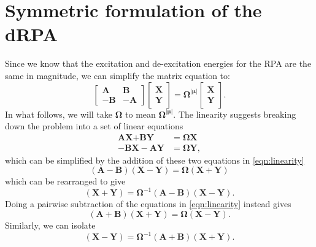 \documentclass[12pt]{caltech_thesis}
\begin{document}
\chapter{Symmetric formulation of the dRPA}
\label{app:symm_drpa}
Since we know that the excitation and de-excitation energies for the RPA are the same in magnitude, we can simplify the matrix equation to:
\begin{equation}
\begin{bmatrix}
\textbf{A} & \textbf{B} \\
-\textbf{B} & -\textbf{A}
\end{bmatrix}
\begin{bmatrix}
\textbf{X} \\
\textbf{Y}
\end{bmatrix}
= \boldsymbol{\Omega^{|\mu|} }
\begin{bmatrix}
\textbf{X} \\
\textbf{Y}
\end{bmatrix}
.
\end{equation}
In what follows, we will take $\boldsymbol{\Omega }$ to mean $\boldsymbol{\Omega^{|\mu|} }$.
The linearity suggests breaking down the problem into a set of linear equations
\begin{align}
    \textbf{AX} + \textbf{BY} &= \boldsymbol{\Omega } \textbf{X}\\
    -\textbf{BX}-\textbf{AY} &= \boldsymbol{\Omega } \textbf{Y},
\label{eqn:linearity}
\end{align}
which can be simplified by the addition of these two equations in \ref{eqn:linearity}
\begin{equation}
    (\textbf{A}-\textbf{B})(\textbf{X}-\textbf{Y})= \boldsymbol{\Omega } (\textbf{X}+\textbf{Y})
\label{eqn:for_addition}
\end{equation}
which can be rearranged to give
\begin{equation}
    (\textbf{X}+\textbf{Y}) = \boldsymbol{\Omega }^{-1}(\textbf{A}-\textbf{B})(\textbf{X}-\textbf{Y}).
\label{eqn:addition}
\end{equation}
Doing a pairwise subtraction of the equations in \ref{eqn:linearity} instead gives
\begin{equation}
    (\textbf{A}+\textbf{B})(\textbf{X}+\textbf{Y})= \boldsymbol{\Omega } (\textbf{X}-\textbf{Y}). 
\label{eqn:for_subtraction}
\end{equation}
Similarly, we can isolate
\begin{equation}
    (\textbf{X}-\textbf{Y}) = \boldsymbol{\Omega }^{-1}(\textbf{A}+\textbf{B})(\textbf{X}+\textbf{Y}).
\label{eqn:subtraction}
\end{equation}
\end{document}
